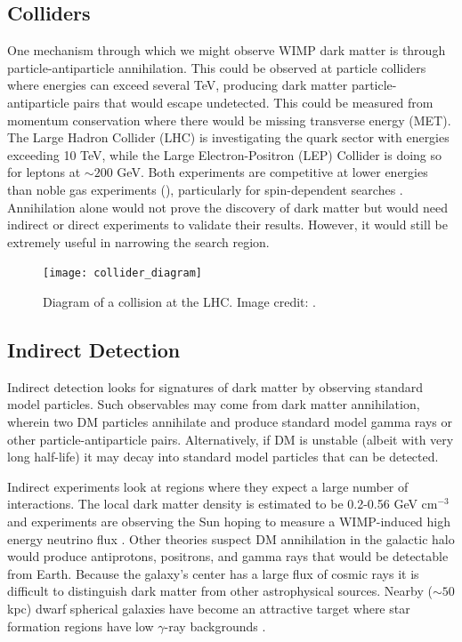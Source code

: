\subsection{Colliders} \label{subsec:colliders}
One mechanism through which we might observe WIMP dark matter is through particle-antiparticle
annihilation.  This could be observed at particle colliders where energies can exceed
several TeV, producing dark matter particle-antiparticle pairs that
would escape undetected.  This could be measured from momentum conservation where there would be missing transverse energy (MET).  The
Large Hadron Collider (LHC) is investigating the quark sector with energies
exceeding 10 TeV, while the Large Electron-Positron (LEP) Collider is doing so for leptons at
${\sim} 200$ GeV.  Both experiments are competitive at lower energies than noble gas experiments (), particularly
for spin-dependent searches .  Annihilation alone would not prove the discovery of dark matter but would
need
indirect or direct experiments to validate their results.  However, it would still be extremely useful in narrowing the search region.

\begin{figure}
\centering
\texttt{[image: collider\_diagram]}
\caption{Diagram of a collision at the LHC.  Image credit: .}
\label{fig:collider}
\end{figure}


\subsection{Indirect Detection} \label{subsec:indirect}
Indirect detection looks for signatures of dark matter by observing standard model particles.  Such observables
may come from dark matter annihilation, wherein two DM particles annihilate and produce standard model
gamma rays or other particle-antiparticle pairs.  Alternatively, if DM is unstable (albeit with very long half-life) it may decay into
standard model particles that can be detected.

Indirect experiments look at regions where they expect a large number of interactions.  The local
dark matter density is estimated to be 0.2-0.56 GeV cm$^{-3}$  and experiments are observing
the Sun hoping to measure a WIMP-induced high energy neutrino flux .  Other theories suspect
DM annihilation in the galactic halo would produce
antiprotons, positrons, and gamma rays that would be detectable from Earth.  Because the galaxy's center
has a large flux of cosmic rays it is difficult to distinguish dark matter from other astrophysical
sources.  Nearby (${\sim} 50$ kpc) dwarf spherical
galaxies have become an attractive target where star formation regions have low $\gamma$-ray backgrounds .

